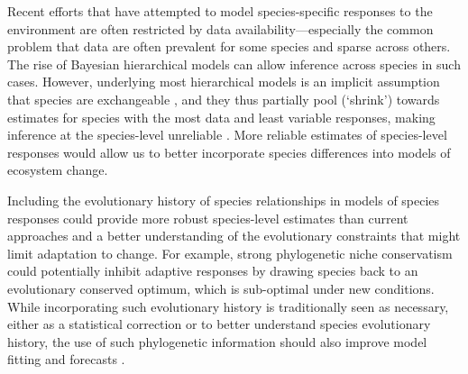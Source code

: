 \documentclass[11pt]{article}
\begin{document}
Recent efforts that have attempted to model species-specific responses to the environment \citep{diez2012forecasting} are often restricted by data availability---especially the common problem that data are often prevalent for some species and sparse across others. The rise of Bayesian hierarchical models can allow inference across species in such cases. However, underlying most hierarchical models is an implicit assumption that species are exchangeable \citep[all species represent samples drawn from the same underlying distribution,][]{gelman2006}, and they thus partially pool (`shrink') towards estimates for species with the most data and least variable responses, making inference at the species-level unreliable \citep{ettinger2020}. More reliable estimates of species-level responses would allow us to better incorporate species differences into models of ecosystem change. 

Including the evolutionary history of species relationships in models of species responses could provide more robust species-level estimates than current approaches and a better understanding of the evolutionary constraints that might limit adaptation to change. For example, strong phylogenetic niche conservatism \citep{wiens2010niche} could potentially inhibit adaptive responses by drawing species back to an evolutionary conserved optimum, which is sub-optimal under new conditions. %
While incorporating such evolutionary history is traditionally seen as necessary, either as a statistical correction or to better understand species evolutionary history, the use of such phylogenetic information should also improve model fitting and forecasts \citep{freckleton2002phylogenetic}.



 
\end{document}
